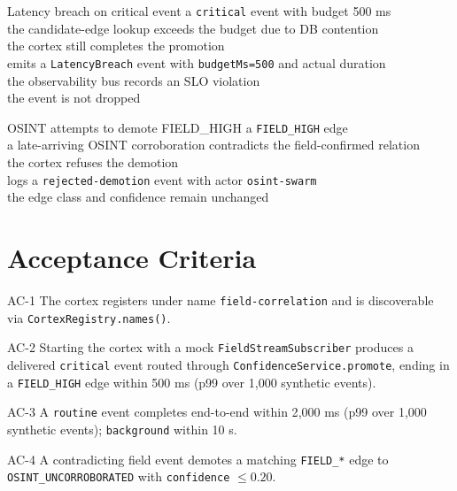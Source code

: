 \begin{scenario}{Latency breach on critical event}
\Given a \texttt{critical} event with budget 500 ms \\
\When the candidate-edge lookup exceeds the budget due to DB contention \\
\Then the cortex still completes the promotion \\
\And emits a \texttt{LatencyBreach} event with \texttt{budgetMs=500} and actual duration \\
\And the observability bus records an SLO violation \\
\And the event is not dropped
\end{scenario}

\begin{scenario}{OSINT attempts to demote FIELD\_HIGH}
\Given a \texttt{FIELD\_HIGH} edge \\
\When a late-arriving OSINT corroboration contradicts the field-confirmed relation \\
\Then the cortex refuses the demotion \\
\And logs a \texttt{rejected-demotion} event with actor \texttt{osint-swarm} \\
\And the edge class and confidence remain unchanged
\end{scenario}

\section{Acceptance Criteria}

\begin{ac}{AC-1}
The cortex registers under name \texttt{field-correlation} and is discoverable via \texttt{CortexRegistry.names()}.
\end{ac}

\begin{ac}{AC-2}
Starting the cortex with a mock \texttt{FieldStreamSubscriber} produces a delivered \texttt{critical} event routed through \texttt{ConfidenceService.promote}, ending in a \texttt{FIELD\_HIGH} edge within 500 ms (p99 over 1{,}000 synthetic events).
\end{ac}

\begin{ac}{AC-3}
A \texttt{routine} event completes end-to-end within 2{,}000 ms (p99 over 1{,}000 synthetic events); \texttt{background} within 10 s.
\end{ac}

\begin{ac}{AC-4}
A contradicting field event demotes a matching \texttt{FIELD\_*} edge to \texttt{OSINT\_UNCORROBORATED} with \texttt{confidence} $\leq 0.20$.
\end{ac}

